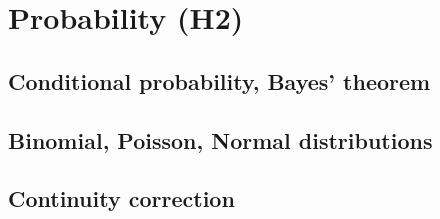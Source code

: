 
\section{Probability (H2)}

\subsection{Conditional probability, Bayes' theorem}


\subsection{Binomial, Poisson, Normal distributions}


\subsection{Continuity correction}

